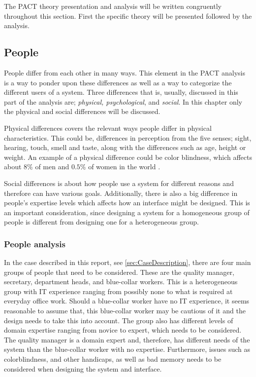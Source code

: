 The PACT theory presentation and analysis will be written congruently throughout this section.
First the specific theory will be presented followed by the analysis.

\subsection{People}\label{sec:PACT-people}
People differ from each other in many ways.
This element in the PACT analysis is a way to ponder upon these differences as well as a way to categorize the different users of a system.
Three differences that is, usually, discussed in this part of the analysis are; \textit{physical, psychological}, and \textit{social}.
In this chapter only the physical and social differences will be discussed.

Physical differences covers the relevant ways people differ in physical characteristics.
This could be, differences in perception from the five senses; sight, hearing, touch, smell and taste, along with the differences such as age, height or weight.
An example of a physical difference could be color blindness, which affects about $8\%$ of men and $0.5\%$ of women in the world \cite{ColourBlind}.

Social differences is about how people use a system for different reasons and therefore can have various goals.
Additionally, there is also a big difference in people's expertise levels which affects how an interface might be designed.
This is an important consideration, since designing a system for a homogeneous group of people is  different from designing one for a heterogeneous group. \cite{Benyon}

\subsubsection*{People analysis}
In the case described in this report, see \cref{sec:CaseDescription}, there are four main groups of people that need to be considered.
These are the quality manager, secretary, department heads, and blue-collar workers.
This is a heterogeneous group with IT experience ranging from possibly none to what is required at everyday office work.
Should a blue-collar worker have no IT experience, it seems reasonable to assume that, this blue-collar worker may be cautious of it and the design needs to take this into account.
The group also has different levels of domain expertise ranging from novice to expert, which needs to be considered.
The quality manager is a domain expert and, therefore, has different needs of the system than the blue-collar worker with no expertise.
Furthermore, issues such as colorblindness, and other handicaps, as well as bad memory needs to be considered when designing the system and interface.

